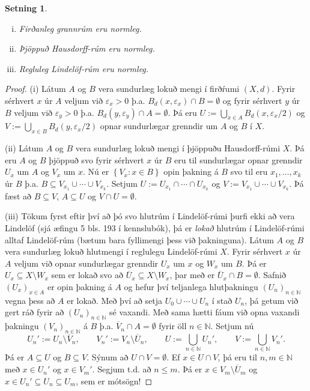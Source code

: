 \documentclass[a4paper,icelandic]{book}
\theoremstyle{definition}
\theoremstyle{plain}
\newtheorem{setn}{Setning}[section]
\theoremstyle{remark}
\newcommand{\N}{\mathbb{N}} %
\begin{document}
\begin{setn}
  \begin{enumerate}[(i)]
    \item Firðanleg grannrúm eru normleg.
    \item Þjöppuð Hausdorff-rúm eru normleg.
    \item Regluleg Lindelöf-rúm eru normleg. 
  \end{enumerate}
\end{setn}
\begin{proof}
  (i) Látum $A$ og $B$ vera sundurlæg lokuð mengi í firðŕumi $(X,d)$.
  Fyrir sérhvert $x$ úr $A$ veljum við $\varepsilon_x>0$ þ.a.
  $B_d(x,\varepsilon_x)\cap B =\emptyset$ og fyrir sérhvert $y$ úr $B$
  veljum við $\varepsilon_y>0$ þ.a. $B_d(y,\varepsilon_y)\cap
  A=\emptyset$. Þá eru $U :=\bigcup_{x\in A} B_d(x,\varepsilon_x/2)$ og
  $V:=\bigcup_{x\in B} B_d(y,\varepsilon_x/2)$ opnar sundurlægar
  grenndir um $A$ og $B$ í $X$. 

  (ii) Látum $A$ og $B$ vera sundurlæg lokuð mengi í þjöppuðu
  Hausdorff-rúmi $X$. Þá eru $A$ og $B$ þjöppuð svo fyrir sérhvert $x$
  úr $B$ eru til sundurlægar opnar grenndir $U_x$ um $A$ og $V_x$ um
  $x$. Nú er $\left\{ V_x : x\in B \right\}$ opin þakning á $B$ svo til
  eru $x_1,\dots,x_k$ úr $B$ þ.a. $B\subseteq V_{x_1}\cup\cdots\cup
  V_{x_k}$. Setjum $U := U_{x_1}\cap\cdots\cap U_{x_k}$ og $V:=
  V_{x_1}\cup\cdots\cup V_{x_k}$. Þá fæst að $B\subseteq V$, $A\subseteq
  U$ og $V\cap U=\emptyset$.

  (iii) Tökum fyrst eftir því að þó svo hlutrúm í Lindelöf-rúmi þurfi
  ekki að vera Lindelöf (sjá æfingu 5 bls. 193 í kennslubók), þá er
  \emph{lokað} hlutrúm í Lindelöf-rúmi alltaf Lindelöf-rúm (bætum bara
  fyllimengi þess við þakninguna). Látum $A$ og $B$ vera sundurlæg lokuð
  hlutmengi í reglulegu Lindelöf-rúmi $X$. Fyrir sérhvert $x$ úr $A$
  veljum við opnar sundurlægar grenndir $U_x$ um $x$ og $W_x$ um $B$.
  Þá er $U_x\subseteq X\setminus W_x$ sem er lokað svo að $\overline
  U_x\subseteq X\setminus W_x$, þar með er $\overline U_x\cap B
  =\emptyset$. Safnið $(U_x)_{x\in A}$ er opin þakning á $A$ og hefur
  því teljanlega hlutþakningu $(U_n)_{n\in\N}$ vegna þess að $A$ er
  lokað. Með því að setja $U_0\cup\cdots\cup U_n$ í stað $U_n$, þá getum
  við gert ráð fyrir að $(U_n)_{n\in\N}$ sé vaxandi. Með sama hætti fáum
  við opna vaxandi þakningu $(V_n)_{n\in\N}$ á $B$ þ.a. $\overline
  V_n\cap A = \emptyset$ fyrir öll $n\in\N$. Setjum nú\[
  U_n' := U_n\setminus\overline V_n, \qquad
  V_n' := V_n\setminus\overline U_n, \qquad
  U    := \bigcup_{n\in\N} U_n',     \qquad
  V    := \bigcup_{n\in\N} V_n'.
  \]
  Þá er $A\subseteq U$ og $B\subseteq V$. Sýnum að $U\cap V =
  \emptyset$. Ef $x\in U\cap V$, þá eru til $n,m\in\N$ með $x\in U_n'$
  og $x\in V_m'$. Segjum t.d. að $n\leq m$. Þá er $x\in
  V_m\setminus\overline U_m$ og $x\in U_n'\subseteq U_n\subseteq U_m$,
  sem er mótsögn!
\end{proof}
\end{document}
